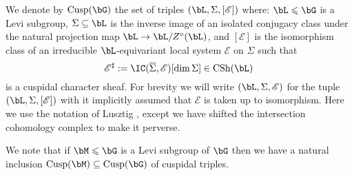 \documentclass[eqthmnum,nocolour,skinny]{jt-calcs}
\DeclareMathOperator{\CS}{CSh}
\DeclareMathOperator{\Cusp}{Cusp}
\begin{document}
\begin{pa}\label{pa:cusp-pairs}
We denote by $\Cusp(\bG)$ the set of triples $(\bL,\Sigma,[\mathscr{E}])$ where: $\bL \leqslant \bG$ is a Levi subgroup, $\Sigma \subseteq \bL$ is the inverse image of an isolated conjugacy class under the natural projection map $\bL \to \bL/Z^{\circ}(\bL)$, and $[\mathscr{E}]$ is the isomorphism class of an irreducible $\bL$-equivariant local system $\mathscr{E}$ on $\Sigma$ such that
\begin{equation*}
\mathscr{E}^{\sharp} := \IC(\overline{\Sigma},\mathscr{E})[\dim\Sigma] \in \CS(\bL)
\end{equation*}
is a cuspidal character sheaf. For brevity we will write $(\bL,\Sigma,\mathscr{E})$ for the tuple $(\bL,\Sigma,[\mathscr{E}])$ with it implicitly assumed that $\mathscr{E}$ is taken up to isomorphism. Here we use the notation of Lusztig \cite[1.4]{lusztig:1990:green-functions-and-character-sheaves}, except we have shifted the intersection cohomology complex to make it perverse.
\end{pa}

\begin{rem}
We note that if $\bM \leqslant \bG$ is a Levi subgroup of $\bG$ then we have a natural inclusion $\Cusp(\bM) \subseteq \Cusp(\bG)$ of cuspidal triples.
\end{rem}
\end{document}
